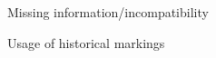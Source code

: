 \documentclass[conference]{IEEEtran}
\begin{document}
\begin{figure}[htbp]
\caption{Missing information/incompatibility}
\label{fig3}
\end{figure}

\begin{figure}[htbp]
\caption{Usage of historical markings}
\label{fig4}
\end{figure}
\end{document}
